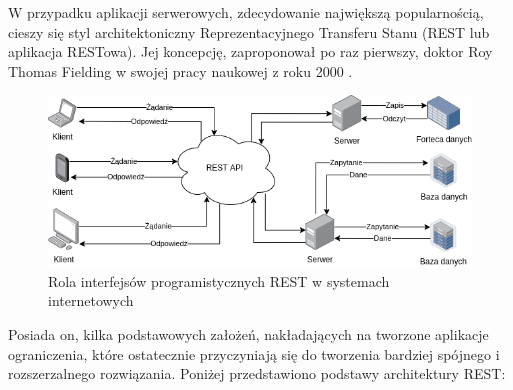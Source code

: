 W przypadku aplikacji serwerowych, zdecydowanie największą popularnością, cieszy się styl architektoniczny Reprezentacyjnego Transferu Stanu (REST lub aplikacja RESTowa). Jej koncepcję, zaproponował po raz pierwszy, doktor Roy Thomas Fielding w swojej pracy naukowej z roku 2000 \cite{restapi.genesis}. 

\begin{figure}[!htbp] 
    \centering
    \includegraphics[width=\textwidth]{img/chapter3/rest.overview.png}
    \caption{Rola interfejsów programistycznych REST w systemach internetowych}
    \label{fig:rest.overview}
\end{figure}

Posiada on, kilka podstawowych założeń, nakładających na tworzone aplikacje ograniczenia, które ostatecznie przyczyniają się do tworzenia bardziej spójnego i rozszerzalnego rozwiązania. Poniżej przedstawiono podstawy architektury REST:

